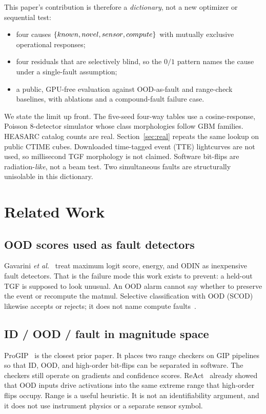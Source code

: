 \documentclass{ieeeaccess}
\begin{document}
This paper's contribution is therefore a \emph{dictionary}, not a new optimizer or sequential test:
\begin{itemize}
\item four causes $\{{\rm known},{\rm novel},{\rm sensor},{\rm compute}\}$ with mutually exclusive operational responses;
\item four residuals that are selectively blind, so the $0/1$ pattern names the cause under a single-fault assumption;
\item a public, GPU-free evaluation against OOD-as-fault and range-check baselines, with ablations and a compound-fault failure case.
\end{itemize}

We state the limit up front. The five-seed four-way tables use a cosine-response, Poisson 8-detector simulator whose class morphologies follow GBM families. HEASARC catalog counts are real. Section~\ref{sec:real} repeats the same lookup on \RealCubes{} public CTIME cubes. Downloaded time-tagged event (TTE) lightcurves are not used, so millisecond TGF morphology is not claimed. Software bit-flips are radiation-\emph{like}, not a beam test. Two simultaneous faults are structurally unisolable in this dictionary.

\section{Related Work}

\subsection{OOD scores used as fault detectors}
Gavarini \textit{et al.}~\cite{gavarini2022} treat maximum logit score, energy, and ODIN as inexpensive fault detectors. That is the failure mode this work exists to prevent: a held-out TGF is supposed to look unusual. An OOD alarm cannot say whether to preserve the event or recompute the matmul. Selective classification with OOD (SCOD) likewise accepts or rejects; it does not name compute faults~\cite{sirc2022,narasimhan2024}.

\subsection{ID / OOD / fault in magnitude space}
ProGIP~\cite{progip2025} is the closest prior paper. It places two range checkers on GIP pipelines so that ID, OOD, and high-order bit-flips can be separated in software. The checkers still operate on gradients and confidence scores. ReAct~\cite{react2021} already showed that OOD inputs drive activations into the same extreme range that high-order flips occupy. Range is a useful heuristic. It is not an identifiability argument, and it does not use instrument physics or a separate sensor symbol.
\end{document}
